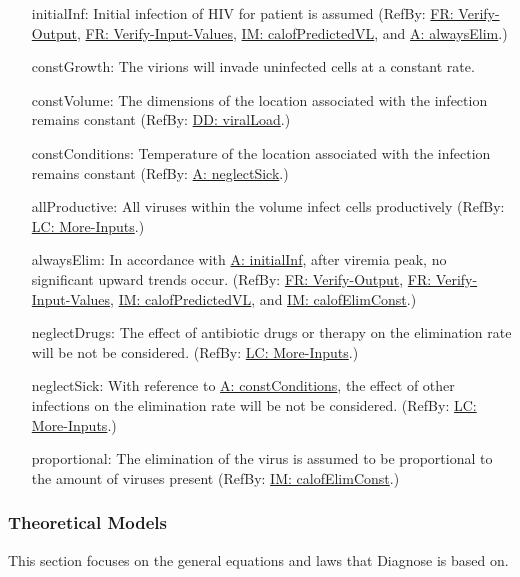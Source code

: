 \documentclass[12pt]{article}
\begin{document}
\begin{itemize}
\item[initialInf:\phantomsection\label{initialInf}]{Initial infection of HIV for patient is assumed (RefBy: \hyperref[verifyOutput]{FR: Verify-Output}, \hyperref[verifyInput]{FR: Verify-Input-Values}, \hyperref[IM:calofPredictedVL]{IM: calofPredictedVL}, and \hyperref[alwaysElim]{A: alwaysElim}.)}
\item[constGrowth:\phantomsection\label{constGrowth}]{The virions will invade uninfected cells at a constant rate.}
\item[constVolume:\phantomsection\label{constVolume}]{The dimensions of the location associated with the infection remains constant (RefBy: \hyperref[DD:viralLoad]{DD: viralLoad}.)}
\item[constConditions:\phantomsection\label{constConditions}]{Temperature of the location associated with the infection remains constant (RefBy: \hyperref[neglectSick]{A: neglectSick}.)}
\item[allProductive:\phantomsection\label{allProductive}]{All viruses within the volume infect cells productively (RefBy: \hyperref[moreInputs]{LC: More-Inputs}.)}
\item[alwaysElim:\phantomsection\label{alwaysElim}]{In accordance with \hyperref[initialInf]{A: initialInf}, after viremia peak, no significant upward trends occur. (RefBy: \hyperref[verifyOutput]{FR: Verify-Output}, \hyperref[verifyInput]{FR: Verify-Input-Values}, \hyperref[IM:calofPredictedVL]{IM: calofPredictedVL}, and \hyperref[IM:calofElimConst]{IM: calofElimConst}.)}
\item[neglectDrugs:\phantomsection\label{neglectDrugs}]{The effect of antibiotic drugs or therapy on the elimination rate will be not be considered. (RefBy: \hyperref[moreInputs]{LC: More-Inputs}.)}
\item[neglectSick:\phantomsection\label{neglectSick}]{With reference to \hyperref[constConditions]{A: constConditions}, the effect of other infections on the elimination rate will be not be considered. (RefBy: \hyperref[moreInputs]{LC: More-Inputs}.)}
\item[proportional:\phantomsection\label{proportional}]{The elimination of the virus is assumed to be proportional to the amount of viruses present (RefBy: \hyperref[IM:calofElimConst]{IM: calofElimConst}.)}
\end{itemize}
\subsubsection{Theoretical Models}
\label{Sec:TMs}
This section focuses on the general equations and laws that Diagnose is based on.
\end{document}
